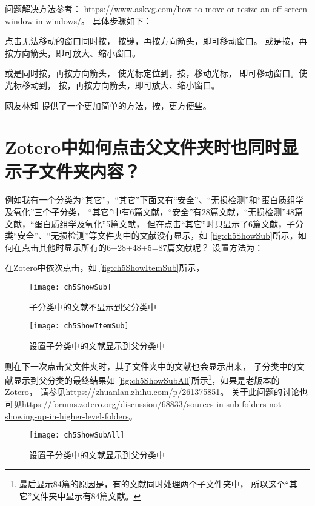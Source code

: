 \documentclass[cn,11pt,chinese]{elegantbook}
\begin{document}
			问题解决方法参考：
			\url{https://www.askvg.com/how-to-move-or-resize-an-off-screen-window-in-windows/}。
			具体步骤如下：
			
			点击无法移动的窗口同时按，
			按键，再按方向箭头，即可移动窗口。
			或是按，再按方向箭头，即可放大、缩小窗口。
			
			或是同时按，再按方向箭头，
			使光标定位到，按，移动光标，
			即可移动窗口。使光标移动到，
			按，再按方向箭头，即可放大、缩小窗口。
			
			网友\href{https://www.zhihu.com/people/lin-zhi-70}{林知}
			提供了一个更加简单的方法，按，更方便些。
	\section{Zotero中如何点击父文件夹时也同时显示子文件夹内容？}\label{sec:ShowSub}	
				例如我有一个分类为“其它”，“其它”下面又有“安全”、“无损检测”和“蛋白质组学及氧化”三个子分类，
				“其它”中有6篇文献，“安全”有28篇文献，“无损检测”48篇文献，“蛋白质组学及氧化”5篇文献，
				但在点击“其它”时只显示了6篇文献，子分类“安全”、“无损检测”等文件夹中的文献没有显示，如
				\autoref{fig:ch5ShowSub}所示，如何在点击其他时显示所有的6+28+48+5=87篇文献呢？
				设置方法为：


				
				在Zotero中依次点击，如
				\autoref{fig:ch5ShowItemSub}所示，
				\begin{figure}[ht]
					\centering
					\texttt{[image: ch5ShowSub]}
					\caption{子分类中的文献不显示到父分类中}
					\label{fig:ch5ShowSub}
				\end{figure}	
				\begin{figure}[ht]
					\centering
					\texttt{[image: ch5ShowItemSub]}
					\caption{设置子分类中的文献显示到父分类中}
					\label{fig:ch5ShowItemSub}
				\end{figure}
				则在下一次点击父文件夹时，其子文件夹中的文献也会显示出来，
				子分类中的文献显示到父分类的最终结果如
				\autoref{fig:ch5ShowSubAll}所示\footnote{
				最后显示84篇的原因是，有的文献同时处理两个子文件夹中，
				所以这个“其它”文件夹中显示有84篇文献。}，如果是老版本的
				Zotero，
				请参见\url{https://zhuanlan.zhihu.com/p/261375851}。
				关于此问题的讨论也可见\url{https://forums.zotero.org/discussion/68833/sources-in-sub-folders-not-showing-up-in-higher-level-folders}。
				\begin{figure}[ht]
					\centering
					\texttt{[image: ch5ShowSubAll]}
					\caption{设置子分类中的文献显示到父分类中}
					\label{fig:ch5ShowSubAll}
				\end{figure}
\end{document}
